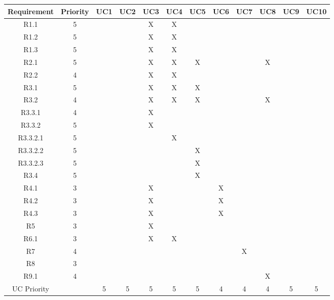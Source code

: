 \documentclass[11pt]{article}
\begin{document}
\begin{center}
	\hspace*{-0.9cm}\begin{tabular}{|c|c|c|c|c|c|c|c|c|c|c|c|}
	\hline
	Requirement & Priority & UC1 & UC2 & UC3 & UC4 & UC5 & UC6 & UC7 & UC8 & UC9 & UC10 \\
	\hline
	R1.1 & 5 & & & X & X & & & & & & \\
	\hline
	R1.2 & 5 & & & X & X & & & & & & \\
	\hline
	R1.3 & 5 & & & X & X & & & & & & \\
	\hline
	R2.1 & 5 & & & X & X & X & & & X & & \\
	\hline
	R2.2 & 4 & & & X & X & & & & & & \\ %
	\hline
	R3.1 & 5 & & & X & X & X & & & & & \\
	\hline
	R3.2 & 4 & & & X & X & X & & & X & & \\ %
	\hline
	R3.3.1 & 4 & & & X & & & & & & & \\
	\hline
	R3.3.2 & 5 & & & X & & & & & & & \\
	\hline
	R3.3.2.1 & 5 & & & & X & & & & & & \\
	\hline
	R3.3.2.2 & 5 & & & & & X & & & & & \\
	\hline
	R3.3.2.3 & 5 & & & & & X & & & & & \\
	\hline
	R3.4 & 5 & & & & & X & & & & & \\
	\hline
	R4.1 & 3 & & & X & & & X & & & & \\
	\hline
	R4.2 & 3 & & & X & & & X & & & & \\
	\hline
	R4.3 & 3 & & & X & & & X & & & & \\
	\hline
	R5 & 3 & & & X & & & & & & & \\
	\hline
	R6.1 & 3 & & & X & X & & & & & & \\
	\hline
	R7 & 4 & & & & & & & X &  & & \\
	\hline
	R8 & 3 & & & & & & & & & & \\
	\hline
	R9.1 & 4 & & & & & & & & X & & \\
	\hline
	UC Priority & & 5 & 5 & 5 & 5 & 5 & 4 & 4 & 4 & 5 & 5 \\
	\hline
	\end{tabular}
\end{center}
\end{document}
